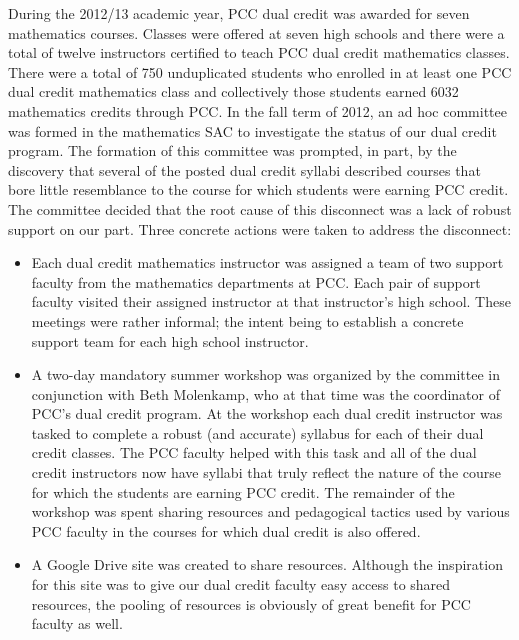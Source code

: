 During the 2012/13 academic year, PCC dual credit was awarded
for seven mathematics courses.  Classes were offered at seven high schools and
there were a total of twelve instructors certified to teach PCC dual credit
mathematics classes.  There were a total of 750 unduplicated students who
enrolled in at least one PCC dual credit mathematics class and collectively
those students earned 6032 mathematics credits through PCC.
In the fall term of 2012, an ad hoc committee was formed in the mathematics SAC to investigate the status of our dual credit program.  The formation of this committee was prompted, in part, by the discovery that several of the posted dual credit syllabi described courses that bore little resemblance to the course for which students were earning PCC credit.  The committee decided that the root cause of this disconnect was a lack of robust support on our part.  Three concrete actions were taken to address the disconnect:
\begin{itemize}
\item Each dual credit mathematics instructor was assigned a team of two support
  faculty from the mathematics departments at PCC.  Each pair of support faculty
  visited their assigned instructor at that instructor's high school.  These
  meetings were rather informal; the intent being to establish a concrete
  support team for each high school instructor.
\item A two-day mandatory summer workshop was organized by the committee in
  conjunction with Beth Molenkamp, who at that time was the coordinator of
  PCC's dual credit program.  At the workshop each dual credit instructor was
  tasked to complete a robust (and accurate) syllabus for each of their dual
  credit classes.  The PCC faculty helped with this task and all of the dual
  credit instructors now have syllabi that truly reflect the nature of the
  course for which the students are earning PCC credit.  The remainder of the
  workshop was spent sharing resources and pedagogical tactics used by various
  PCC faculty in the courses for which dual credit is also offered.
\item A Google Drive site was created to share resources.  Although the
  inspiration for this site was to give our dual credit faculty easy access to
  shared resources, the pooling of resources is obviously of great benefit for
  PCC faculty as well.
\end{itemize}

